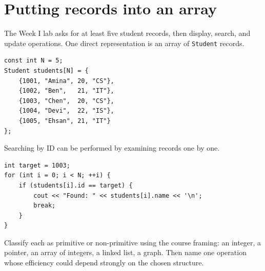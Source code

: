 \section{Putting records into an array}

The Week I lab asks for at least five student records, then display, search, and update operations. One direct representation is an array of \texttt{Student} records.

\begin{lstlisting}
const int N = 5;
Student students[N] = {
    {1001, "Amina", 20, "CS"},
    {1002, "Ben",   21, "IT"},
    {1003, "Chen",  20, "CS"},
    {1004, "Devi",  22, "IS"},
    {1005, "Ehsan", 21, "IT"}
};
\end{lstlisting}

Searching by ID can be performed by examining records one by one.

\begin{lstlisting}
int target = 1003;
for (int i = 0; i < N; ++i) {
    if (students[i].id == target) {
        cout << "Found: " << students[i].name << '\n';
        break;
    }
}
\end{lstlisting}

\begin{quickcheck}
Classify each as primitive or non-primitive using the course framing: an integer, a pointer, an array of integers, a linked list, a graph. Then name one operation whose efficiency could depend strongly on the chosen structure.
\end{quickcheck}


